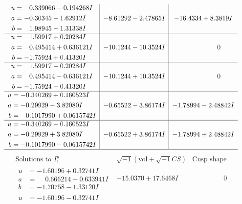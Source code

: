 \documentclass[1p]{elsarticle_modified}
\theoremstyle{definition}
\newcommand{\I}{\sqrt{-1}}
\begin{document}
$$\begin{array}{c|c|c}
\begin{aligned}
u &= \phantom{-}0.339066 - 0.194268 I \\
a &= -0.30345 - 1.62912 I \\
b &= \phantom{-}1.98945 - 1.31338 I\end{aligned}
 & -8.61292 - 2.47865 I & -16.4334 + 8.3819 I \\ \hline\begin{aligned}
u &= \phantom{-}1.59917 + 0.20284 I \\
a &= \phantom{-}0.495414 + 0.636121 I \\
b &= -1.75924 + 0.41320 I\end{aligned}
 & -10.1244 - 10.3524 I & \phantom{-0.000000 } 0 \\ \hline\begin{aligned}
u &= \phantom{-}1.59917 - 0.20284 I \\
a &= \phantom{-}0.495414 - 0.636121 I \\
b &= -1.75924 - 0.41320 I\end{aligned}
 & -10.1244 + 10.3524 I & \phantom{-0.000000 } 0 \\ \hline\begin{aligned}
u &= -0.340269 + 0.160523 I \\
a &= -0.29929 - 3.82080 I \\
b &= -0.1017990 + 0.0615742 I\end{aligned}
 & -0.65522 - 3.86174 I & -1.78994 - 2.48842 I \\ \hline\begin{aligned}
u &= -0.340269 - 0.160523 I \\
a &= -0.29929 + 3.82080 I \\
b &= -0.1017990 - 0.0615742 I\end{aligned}
 & -0.65522 + 3.86174 I & -1.78994 + 2.48842 I\\
 \hline 
 \end{array}$$\newpage$$\begin{array}{c|c|c}  
\text{Solutions to }I^u_{1}& \I (\text{vol} + \sqrt{-1}CS) & \text{Cusp shape}\\
 \hline 
\begin{aligned}
u &= -1.60196 + 0.32741 I \\
a &= \phantom{-}0.666214 - 0.633941 I \\
b &= -1.70758 - 1.33120 I\end{aligned}
 & -15.0370 + 17.6468 I & \phantom{-0.000000 } 0 \\ \hline\begin{aligned}
u &= -1.60196 - 0.32741 I \\

\end{aligned}
\end{array}$$
\end{document}
